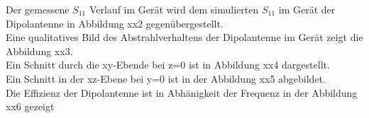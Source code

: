 Der gemessene $S_{11}$ Verlauf im Gerät wird dem simulierten $S_{11}$ im Gerät der Dipolantenne in Abbildung xx2 gegenübergestellt.\\
%	

Eine qualitatives Bild des Abstrahlverhaltens der Dipolantenne im Gerät zeigt die Abbildung xx3.\\
Ein Schnitt durch die xy-Ebende bei z=0 ist in Abbildung xx4 dargestellt.\\
%	
Ein Schnitt in der xz-Ebene bei y=0 ist in der Abbildung xx5 abgebildet.\\
%	
Die Effizienz der Dipolantenne ist in Abhänigkeit der Frequenz in der Abbildung xx6 gezeigt\\
%	
